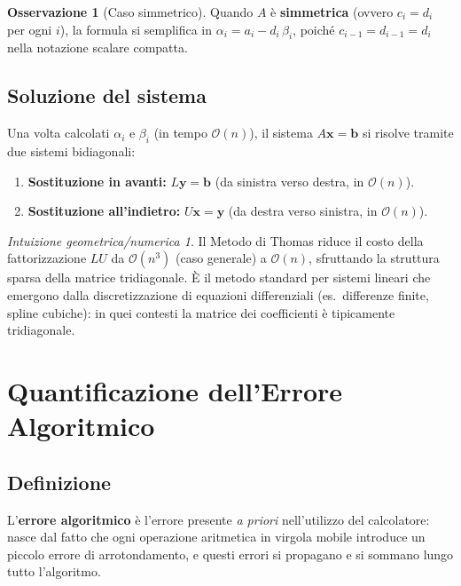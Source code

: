\documentclass[a4paper,12pt]{article}
\theoremstyle{definition}
\newtheorem{osservazione}{Osservazione}[section]
\theoremstyle{remark}
\newtheorem*{intuizione}{Intuizione geometrica/numerica}
\begin{document}
\begin{osservazione}[Caso simmetrico]
Quando $A$ è \textbf{simmetrica} (ovvero $c_i = d_i$ per ogni $i$), la
formula si semplifica in $\alpha_i = a_i - d_i\,\beta_i$, poiché
$c_{i-1} = d_{i-1} = d_i$ nella notazione scalare compatta.
\end{osservazione}

\subsection{Soluzione del sistema}

Una volta calcolati $\alpha_i$ e $\beta_i$ (in tempo $\mathcal{O}(n)$),
il sistema $A\mathbf{x} = \mathbf{b}$ si risolve tramite due sistemi
bidiagonali:
\begin{enumerate}
  \item \textbf{Sostituzione in avanti:} $L\mathbf{y} = \mathbf{b}$
        (da sinistra verso destra, in $\mathcal{O}(n)$).
  \item \textbf{Sostituzione all'indietro:} $U\mathbf{x} = \mathbf{y}$
        (da destra verso sinistra, in $\mathcal{O}(n)$).
\end{enumerate}

\begin{intuizione}
Il Metodo di Thomas riduce il costo della fattorizzazione $LU$ da
$\mathcal{O}(n^3)$ (caso generale) a $\mathcal{O}(n)$, sfruttando la
struttura sparsa della matrice tridiagonale. È il metodo standard per
sistemi lineari che emergono dalla discretizzazione di equazioni
differenziali (es.\ differenze finite, spline cubiche): in quei contesti
la matrice dei coefficienti è tipicamente tridiagonale.
\end{intuizione}

\section{Quantificazione dell'Errore Algoritmico}

\subsection{Definizione}

L'\textbf{errore algoritmico} è l'errore presente \emph{a priori}
nell'utilizzo del calcolatore: nasce dal fatto che ogni operazione aritmetica
in virgola mobile introduce un piccolo errore di arrotondamento, e questi
errori si propagano e si sommano lungo tutto l'algoritmo.
\end{document}

